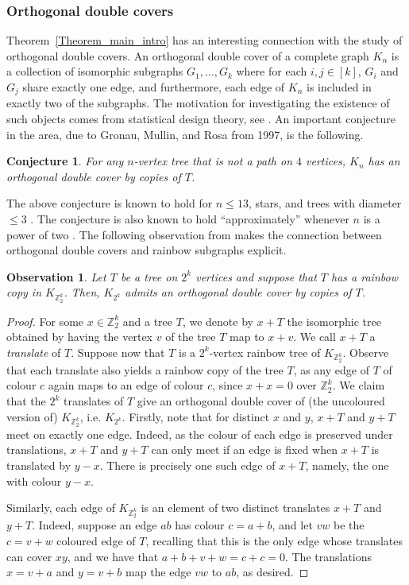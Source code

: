 \documentclass[a4paper,11pt,hidelinks]{amsart}
\newtheorem{observation}[theorem]{Observation}
\newtheorem{conjecture}[theorem]{Conjecture}
\theoremstyle{definition}
\begin{document}
\subsubsection{Orthogonal double covers}
\par Theorem~\ref{Theorem_main_intro} has an interesting connection with the study of orthogonal double covers. An orthogonal double cover of a complete graph $K_n$ is a collection of isomorphic subgraphs $G_1,\ldots, G_k$ where for each $i,j\in [k]$, $G_i$ and $G_j$ share exactly one edge, and furthermore, each edge of $K_n$ is included in exactly two of the subgraphs. The motivation for investigating the existence of such objects comes from statistical design theory, see \cite[Chapter 2]{dinitz1992contemporary}. An important conjecture in the area, due to Gronau, Mullin, and Rosa \cite{gronau1997orthogonal} from 1997, is the following. 
\begin{conjecture}
    For any $n$-vertex tree that is not a path on $4$ vertices, $K_n$ has an orthogonal double cover by copies of $T$. 
\end{conjecture}
The above conjecture is known to hold for $n\leq 13$, stars, and trees with diameter $\leq 3$ \cite{gronau1997orthogonal, leck1997orthogonal}. The conjecture is also known to hold ``approximately'' whenever $n$ is a power of two \cite{approximateringel}. The following observation from \cite{approximateringel} makes the connection between orthogonal double covers and rainbow subgraphs explicit. 
\begin{observation}\label{obs:cyclicshift}
    Let $T$ be a tree on $2^k$ vertices and suppose that $T$ has a rainbow copy in $K_{\mathbb{Z}_2^k}$. Then, $K_{2^k}$ admits an orthogonal double cover by copies of $T$.
\end{observation}
\begin{proof}
    For some $x\in \mathbb{Z}_2^k$ and a tree $T$, we denote by $x+T$ the isomorphic tree obtained by having the vertex $v$ of the tree $T$ map to $x+v$. We call $x+T$ a \textit{translate} of $T$. Suppose now that $T$ is a $2^k$-vertex rainbow tree of  $K_{\mathbb{Z}_2^k}$. Observe that each translate also yields a rainbow copy of the tree $T$, as any edge of $T$ of colour $c$ again maps to an edge of colour $c$, since $x+x=0$ over $\mathbb{Z}_{2}^k$. We claim that the $2^{k}$ translates of $T$ give an orthogonal double cover of (the uncoloured version of) $K_{\mathbb{Z}_2^k}$, i.e. $K_{2^k}$. Firstly, note that for distinct $x$ and $y$, $x+T$ and $y+T$ meet on exactly one edge. Indeed, as the colour of each edge is preserved under translations, $x+T$ and $y+T$ can only meet if an edge is fixed when $x+T$ is translated by $y-x$. There is precisely one such edge of $x+T$, namely, the one with colour $y-x$. 
    \par Similarly, each edge of $K_{\mathbb{Z}_2^k}$ is an element of two distinct translates $x+T$ and $y+T$. Indeed, suppose an edge $ab$ has colour $c=a+b$, and let $vw$ be the $c=v+w$ coloured edge of $T$, recalling that this is the only edge whose translates can cover $xy$, and we have that $a+b+v+w=c+c=0$. The translations $x=v+a$ and $y=v+b$ map the edge $vw$ to $ab$, as desired.
\end{proof}
\end{document}
